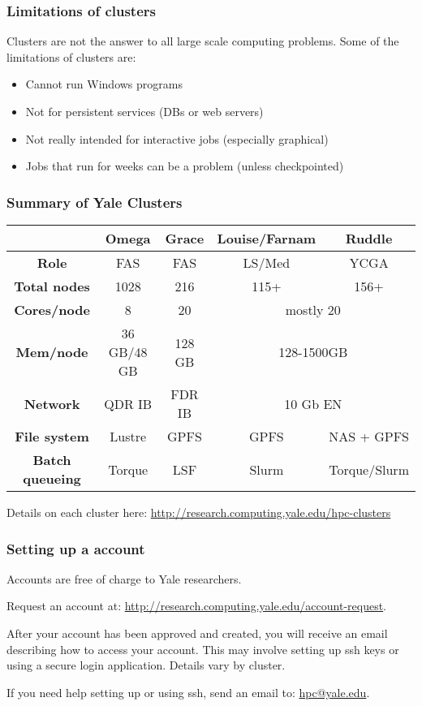 \documentclass[10pt]{beamer}
\begin{document}
\begin{frame}
\frametitle{Limitations of clusters}
Clusters are not the answer to all large scale computing problems.
Some of the limitations of clusters are:

\begin{itemize}
\item Cannot run Windows programs
\item Not for persistent services (DBs or web servers)
\item Not really intended for interactive jobs (especially graphical)
\item Jobs that run for weeks can be a problem (unless checkpointed)
\end{itemize}
\end{frame}

\begin{frame}[fragile]
\frametitle{Summary of Yale Clusters}
\begin{tabular}{|c|c|c|c|c|}
\hline
& \textbf{Omega} & \textbf{Grace}& \textbf{Louise/Farnam} & \textbf{Ruddle} \\
\hline
\textbf{Role} & FAS & FAS & LS/Med & YCGA  \\
\hline
\textbf{Total nodes} & 1028 & 216 & 115+ & 156+  \\
\hline
\textbf{Cores/node} & 8 & 20 & \multicolumn{2}{c}{mostly 20} \\
\hline
\textbf{Mem/node} & 36 GB/48 GB & 128 GB & \multicolumn{2}{c}{128-1500GB}  \\
\hline
\textbf{Network} & QDR IB & FDR IB& \multicolumn{2}{c}{10 Gb EN}  \\
\hline
\textbf{File system} & Lustre & GPFS & GPFS & NAS + GPFS \\
\hline
\textbf{Batch queueing} & Torque & LSF & Slurm & Torque/Slurm \\
\hline
\end{tabular}

\vskip10pt

Details on each cluster here:
\url{http://research.computing.yale.edu/hpc-clusters}

\end{frame}

\begin{frame}[fragile]
\frametitle{Setting up a account}

Accounts are free of charge to Yale researchers.
\vskip10pt

Request an account at: \url{http://research.computing.yale.edu/account-request}.

\vskip10pt
After your account has been approved and created, you will receive
an email describing how to access your account.  This may involve setting up ssh keys or 
using a secure login application.  Details vary by cluster.

\vskip10pt
If you need help setting up or using ssh, send an email to: \url{hpc@yale.edu}.
\end{frame}
\end{document}

